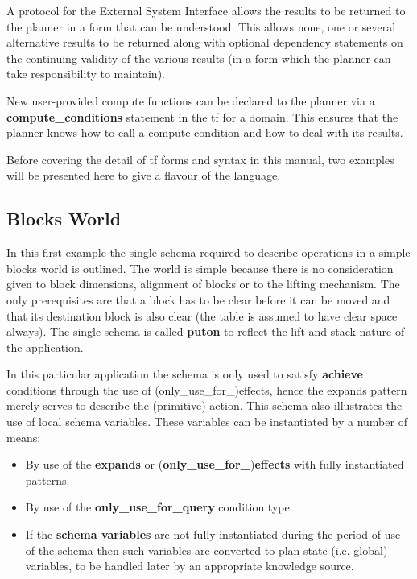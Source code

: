 A protocol for the External System Interface allows the results to be returned
to the planner in a form that can be understood.  This allows none, one or
several alternative results to be returned along with optional dependency
statements on the continuing validity of the various results (in a form which
the planner can take responsibility to maintain).

New user-provided compute functions can be declared to the planner via a
{\bf compute\_conditions} statement in the {\sc tf} for a domain.  This
ensures that the planner knows how to call a compute condition and how to
deal with its results.


Before covering the detail of {\sc tf} forms and syntax in this manual,
two examples will be presented here to give a flavour of the language.

\subsection{Blocks World}
In this first example the single schema required to describe operations in a
simple blocks world is outlined. The world is simple because
there is no consideration given to block dimensions, alignment of blocks or to
the lifting mechanism. The only prerequisites are that a block has to be
clear before it can be moved and that its destination block is also clear (the
table is assumed to have clear space always). The single schema is called {\bf
puton} to reflect the lift-and-stack nature of the application.

In this particular application the schema is only used to satisfy {\bf
achieve} conditions through the use of (only\_use\_for\_)effects, hence the
expands pattern merely serves to describe the (primitive) action.  This schema
also illustrates the use of local schema variables.  These variables can be
instantiated by a number of means:

\begin{itemize}

\item
By use of the {\bf expands} or ({\bf only\_use\_for\_}){\bf effects} with
fully instantiated patterns.

\item
By use of the {\bf only\_use\_for\_query} condition type. 

\item
If the {\bf schema variables} are not fully
instantiated during the period of use of the schema then such variables
are converted to plan state (i.e. global) variables, to be handled later
by an appropriate knowledge source. 

\end{itemize}

